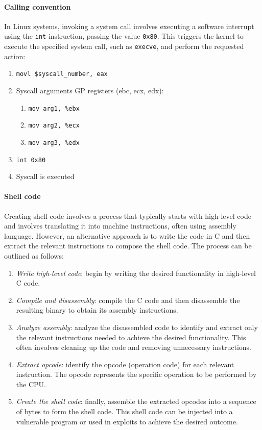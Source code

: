 \paragraph*{Calling convention}
In Linux systems, invoking a system call involves executing a software interrupt using the \texttt{int} instruction, passing the value \texttt{0x80}. 
This triggers the kernel to execute the specified system call, such as \texttt{execve}, and perform the requested action: 
\begin{enumerate}
    \item \texttt{movl \$syscall\_number, eax}
    \item Syscall arguments GP registers (ebc, ecx, edx): 
        \begin{enumerate}
            \item \texttt{mov arg1, \%ebx}
            \item \texttt{mov arg2, \%ecx}
            \item \texttt{mov arg3, \%edx}
        \end{enumerate}
    \item \texttt{int 0x80} 
    \item Syscall is executed
\end{enumerate}

\paragraph*{Shell code}
Creating shell code involves a process that typically starts with high-level code and involves translating it into machine instructions, often using assembly language. However, an alternative approach is to write the code in C and then extract the relevant instructions to compose the shell code. The process can be outlined as follows:
\begin{enumerate}
    \item \textit{Write high-level code}: begin by writing the desired functionality in high-level C code.
    \item \textit{Compile and disassembly}: compile the C code and then disassemble the resulting binary to obtain its assembly instructions.
    \item \textit{Analyze assembly}: analyze the disassembled code to identify and extract only the relevant instructions needed to achieve the desired functionality. 
        This often involves cleaning up the code and removing unnecessary instructions.
    \item \textit{Extract opcode}: identify the opcode (operation code) for each relevant instruction. The opcode represents the specific operation to be performed by the CPU.
    \item \textit{Create the shell code}: finally, assemble the extracted opcodes into a sequence of bytes to form the shell code. 
        This shell code can be injected into a vulnerable program or used in exploits to achieve the desired outcome.
\end{enumerate}

